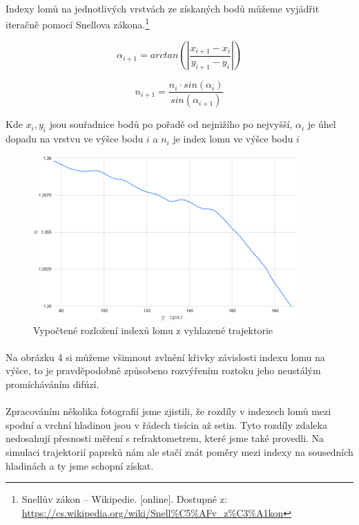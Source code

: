 \documentclass[10pt,a4paper]{article}
\begin{document}
\paragraph{}
Indexy lomů na jednotlivých vrstvách ze získaných bodů můžeme vyjádřit iteračně pomocí Snellova zákona.\footnote{Snellův zákon – Wikipedie. [online]. Dostupné z: \url{https://cs.wikipedia.org/wiki/Snell\%C5\%AFv_z\%C3\%A1kon}}


\begin{equation*}
  \alpha_{i+1} = arctan\left ( \left |  \frac{x_{i+1} - x_{i}}{y_{i+1} - y_{i}} \right | \right )
\end{equation*}

\begin{equation*}
  n_{i+1}=\frac{n_{i} \cdot  sin(\alpha _{i})}{sin(\alpha _{i+1})}
\end{equation*}

Kde $x_{i}, y_{i}$ jsou souřadnice bodů po pořadě od nejnižího po nejvyšší,
$\alpha_{i}$ je úhel dopadu na vrstvu ve výšce bodu $i$ a $n_{i}$ je index lomu ve výšce bodu $i$


\begin{figure}[H]
\centering
    \includegraphics[width=0.9\textwidth]{n1-prohozene.png}
    \caption{Vypočtené rozložení indexů lomu z vyhlazené trajektorie}
    \label{fig:chart1}
\end{figure}

\paragraph{}
Na obrázku 4 si můžeme všimnout zvlnění křivky závislosti indexu lomu na výšce, to je pravděpodobně způsobeno rozvýřením roztoku jeho neustálým promícháváním difúzí.

\paragraph{}
Zpracováním několika fotografií jsme zjistili, že rozdíly v indexech lomů mezi spodní a vrchní hladinou jsou v řádech tisícin až setin. Tyto rozdíly zdaleka nedosahují přesnosti měření s refraktometrem, které jsme také provedli. Na simulaci trajektorií paprsků nám ale stačí znát poměry mezi indexy na sousedních hladinách a ty jsme schopní získat.
\end{document}
